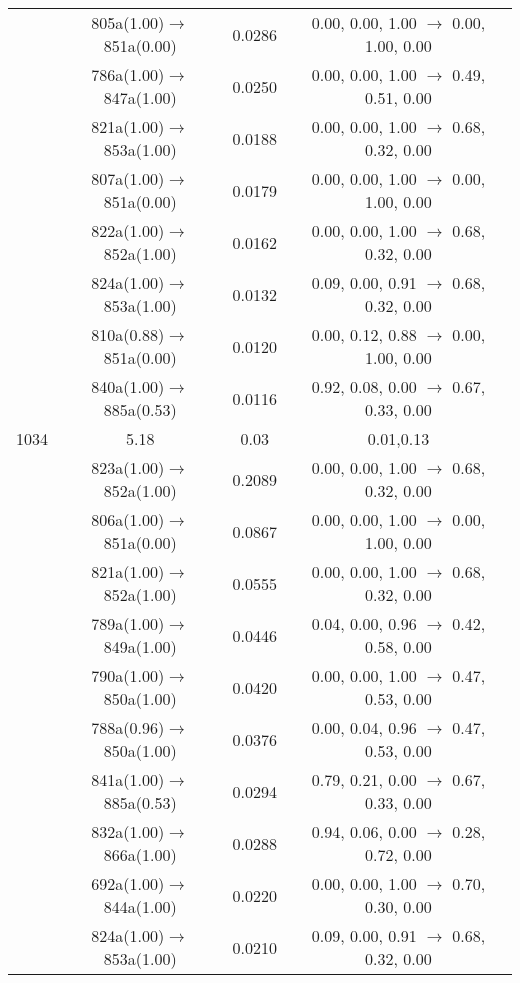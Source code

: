 \documentclass[10pt,a4paper]{article}
\begin{document}
\begin{longtable}{c|c|c|c}
 	& 805a(1.00)$\rightarrow$851a(0.00) &	 0.0286 &	 0.00, 0.00, 1.00 $\rightarrow$ 0.00, 1.00, 0.00 \\ 
 	& 786a(1.00)$\rightarrow$847a(1.00) &	 0.0250 &	 0.00, 0.00, 1.00 $\rightarrow$ 0.49, 0.51, 0.00 \\ 
 	& 821a(1.00)$\rightarrow$853a(1.00) &	 0.0188 &	 0.00, 0.00, 1.00 $\rightarrow$ 0.68, 0.32, 0.00 \\ 
 	& 807a(1.00)$\rightarrow$851a(0.00) &	 0.0179 &	 0.00, 0.00, 1.00 $\rightarrow$ 0.00, 1.00, 0.00 \\ 
 	& 822a(1.00)$\rightarrow$852a(1.00) &	 0.0162 &	 0.00, 0.00, 1.00 $\rightarrow$ 0.68, 0.32, 0.00 \\ 
 	& 824a(1.00)$\rightarrow$853a(1.00) &	 0.0132 &	 0.09, 0.00, 0.91 $\rightarrow$ 0.68, 0.32, 0.00 \\ 
 	& 810a(0.88)$\rightarrow$851a(0.00) &	 0.0120 &	 0.00, 0.12, 0.88 $\rightarrow$ 0.00, 1.00, 0.00 \\ 
 	& 840a(1.00)$\rightarrow$885a(0.53) &	 0.0116 &	 0.92, 0.08, 0.00 $\rightarrow$ 0.67, 0.33, 0.00 \\ 
 \hline1034 &	 5.18 &	 0.03 &	 0.01,0.13 \\ 
  	& 823a(1.00)$\rightarrow$852a(1.00) &	 0.2089 &	 0.00, 0.00, 1.00 $\rightarrow$ 0.68, 0.32, 0.00 \\ 
 	& 806a(1.00)$\rightarrow$851a(0.00) &	 0.0867 &	 0.00, 0.00, 1.00 $\rightarrow$ 0.00, 1.00, 0.00 \\ 
 	& 821a(1.00)$\rightarrow$852a(1.00) &	 0.0555 &	 0.00, 0.00, 1.00 $\rightarrow$ 0.68, 0.32, 0.00 \\ 
 	& 789a(1.00)$\rightarrow$849a(1.00) &	 0.0446 &	 0.04, 0.00, 0.96 $\rightarrow$ 0.42, 0.58, 0.00 \\ 
 	& 790a(1.00)$\rightarrow$850a(1.00) &	 0.0420 &	 0.00, 0.00, 1.00 $\rightarrow$ 0.47, 0.53, 0.00 \\ 
 	& 788a(0.96)$\rightarrow$850a(1.00) &	 0.0376 &	 0.00, 0.04, 0.96 $\rightarrow$ 0.47, 0.53, 0.00 \\ 
 	& 841a(1.00)$\rightarrow$885a(0.53) &	 0.0294 &	 0.79, 0.21, 0.00 $\rightarrow$ 0.67, 0.33, 0.00 \\ 
 	& 832a(1.00)$\rightarrow$866a(1.00) &	 0.0288 &	 0.94, 0.06, 0.00 $\rightarrow$ 0.28, 0.72, 0.00 \\ 
 	& 692a(1.00)$\rightarrow$844a(1.00) &	 0.0220 &	 0.00, 0.00, 1.00 $\rightarrow$ 0.70, 0.30, 0.00 \\ 
 	& 824a(1.00)$\rightarrow$853a(1.00) &	 0.0210 &	 0.09, 0.00, 0.91 $\rightarrow$ 0.68, 0.32, 0.00 \\ 

\end{longtable}
\end{document}
